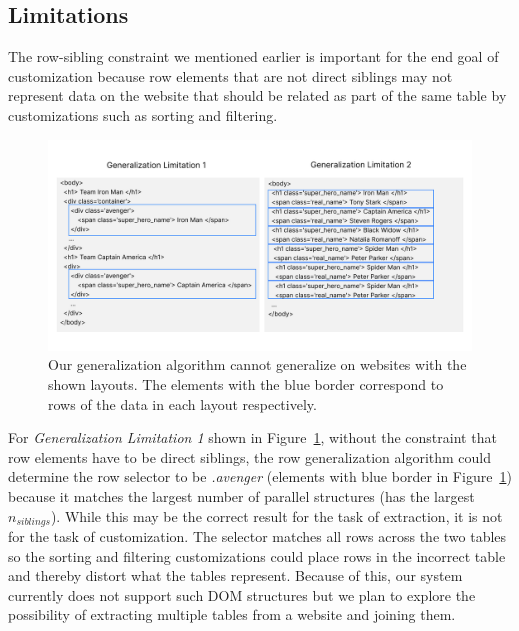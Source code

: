 \documentclass[sigconf,10pt]{acmart}
\begin{document}
\hypertarget{limitations}{%
\subsection{Limitations}\label{limitations}}

The row-sibling constraint we mentioned earlier is important for the end
goal of customization because row elements that are not direct siblings
may not represent data on the website that should be related as part of
the same table by customizations such as sorting and filtering.

\begin{figure}
  \includegraphics[width=\textwidth]{media/limitations.png}
  \caption{\label{fig:limitations} Our generalization algorithm cannot generalize on websites with the shown layouts. The elements with the blue border correspond to rows of the data in each layout respectively.}
\end{figure}

For \emph{Generalization Limitation 1} shown in
Figure~\ref{fig:limitations}, without the constraint that row elements
have to be direct siblings, the row generalization algorithm could
determine the row selector to be \emph{.avenger} (elements with blue
border in Figure~\ref{fig:limitations}) because it matches the largest
number of parallel structures (has the largest \(n_{siblings}\)). While
this may be the correct result for the task of extraction, it is not for
the task of customization. The selector matches all rows across the two
tables so the sorting and filtering customizations could place rows in
the incorrect table and thereby distort what the tables represent.
Because of this, our system currently does not support such DOM
structures but we plan to explore the possibility of extracting multiple
tables from a website and joining them.
\end{document}
